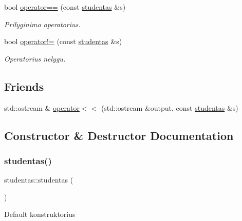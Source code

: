 \begin{DoxyCompactItemize}
bool \mbox{\hyperlink{classstudentas_a0ad8d0b569e5beb7b34238fa87267b77}{operator==}} (const \mbox{\hyperlink{classstudentas}{studentas}} \&s)
\begin{DoxyCompactList}\small\item\em Prilyginimo operatorius. \end{DoxyCompactList}\item 
bool \mbox{\hyperlink{classstudentas_a10674181ae77cc4fe4b65fc0eddf2e8b}{operator!=}} (const \mbox{\hyperlink{classstudentas}{studentas}} \&s)
\begin{DoxyCompactList}\small\item\em Operatorius nelygu. \end{DoxyCompactList}\end{DoxyCompactItemize}
\subsection*{Friends}
\begin{DoxyCompactItemize}
\item 
std\+::ostream \& \mbox{\hyperlink{classstudentas_af8a3f13df24a4944124f75273a08e397}{operator$<$$<$}} (std\+::ostream \&output, const \mbox{\hyperlink{classstudentas}{studentas}} \&s)
\end{DoxyCompactItemize}


\subsection{Constructor \& Destructor Documentation}
\mbox{\label{classstudentas_a40a99ea5d527a3d443123f4785550787}} 
\subsubsection{\texorpdfstring{studentas()}{studentas()}\hspace{0.1cm}{\footnotesize\ttfamily [1/2]}}
{\footnotesize\ttfamily studentas\+::studentas (\begin{DoxyParamCaption}{ }\end{DoxyParamCaption})\hspace{0.3cm}{\ttfamily [inline]}}

Default konstruktorius \mbox{\label{classstudentas_acb3167a335b73211915751ba1652e302}} 
